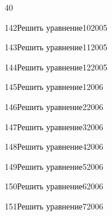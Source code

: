 \begin{TrigSourcePage}{40}
\begin{TrigExercise}{142}{Решить уравнение}{10}{2005}
\end{TrigExercise}
\begin{TrigExercise}{143}{Решить уравнение}{11}{2005}
\end{TrigExercise}
\begin{TrigExercise}{144}{Решить уравнение}{12}{2005}
\end{TrigExercise}
\begin{TrigExercise}{145}{Решить уравнение}{1}{2006}
\end{TrigExercise}
\begin{TrigExercise}{146}{Решить уравнение}{2}{2006}
\end{TrigExercise}
\begin{TrigExercise}{147}{Решить уравнение}{3}{2006}
\end{TrigExercise}
\begin{TrigExercise}{148}{Решить уравнение}{4}{2006}
\end{TrigExercise}
\begin{TrigExercise}{149}{Решить уравнение}{5}{2006}
\end{TrigExercise}
\begin{TrigExercise}{150}{Решить уравнение}{6}{2006}
\end{TrigExercise}
\begin{TrigExercise}{151}{Решить уравнение}{7}{2006}

\end{TrigExercise}
\end{TrigSourcePage}
